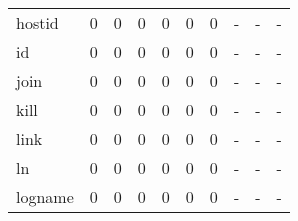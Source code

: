 \begin{longtable}{lp{1.3cm}p{1.3cm}p{1.3cm}p{1.3cm}p{1.3cm}p{1.3cm}p{1.3cm}p{1.3cm}p{1.3cm}}
hostid    &                      0 &                                             0 &                                            0 &                                           0 &                                            0 &                                          0 &                                    - &                                      - &                                    - \\
id        &                      0 &                                             0 &                                            0 &                                           0 &                                            0 &                                          0 &                                    - &                                      - &                                    - \\
join      &                      0 &                                             0 &                                            0 &                                           0 &                                            0 &                                          0 &                                    - &                                      - &                                    - \\
kill      &                      0 &                                             0 &                                            0 &                                           0 &                                            0 &                                          0 &                                    - &                                      - &                                    - \\
link      &                      0 &                                             0 &                                            0 &                                           0 &                                            0 &                                          0 &                                    - &                                      - &                                    - \\
ln        &                      0 &                                             0 &                                            0 &                                           0 &                                            0 &                                          0 &                                    - &                                      - &                                    - \\
logname   &                      0 &                                             0 &                                            0 &                                           0 &                                            0 &                                          0 &                                    - &                                      - &                                    - \\

\end{longtable}
